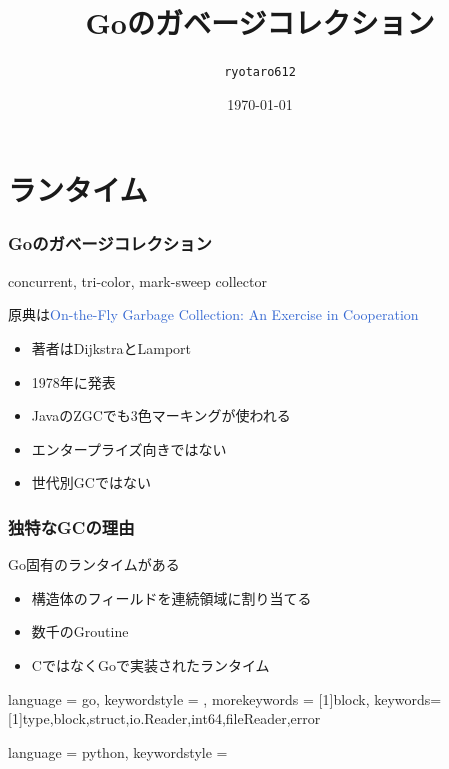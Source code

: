 \documentclass[unicode, 14pt, aspectratio=169]{beamer}
\date{\today}
\title{Goのガベージコレクション}
\author{\texttt{ryotaro612}}
\begin{document}
\begin{frame}
\titlepage
\end{frame}
\section{ランタイム}
\begin{frame}
  \frametitle{Goのガベージコレクション}
  {\large concurrent, tri-color, mark-sweep collector\supercite{go15gc}}
  \par
  原典は\textcolor{highlight}{{\small On-the-Fly Garbage Collection: An Exercise in Cooperation\supercite{on-the-fly}}}
  \begin{itemize}
  \item 著者はDijkstraとLamport
  \item 1978年に発表
  \item JavaのZGCでも3色マーキングが使われる\supercite{zgc}
  \item エンタープライズ向きではない
  \item 世代別GCではない
  \end{itemize}
\end{frame}
\begin{frame}
  \frametitle{独特なGCの理由}
  {\large Go固有のランタイムがある\supercite{go-gc}}
  \begin{itemize}
  \item 構造体のフィールドを連続領域に割り当てる
  \item 数千のGroutine
  \item CではなくGoで実装されたランタイム
  \end{itemize}
\end{frame}

{
  language = go,
  keywordstyle = {\bfseries\color{highlight}},
  morekeywords = [1]{block},
  keywords=[1]{type,block,struct,io.Reader,int64,fileReader,error}
}

{
  language = python,
  keywordstyle = {\bfseries\color{highlight}}
}
\end{document}
